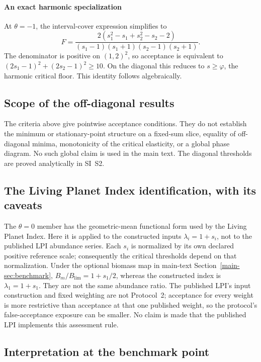 \documentclass[preprint,11pt,authoryear]{elsarticle}
\theoremstyle{remark}
\begin{document}
\paragraph{An exact harmonic specialization} At $\theta=-1$, the interval-cover expression simplifies to
\[
F=\frac{2(s_1^2-s_1+s_2^2-s_2-2)}{(s_1-1)(s_1+1)(s_2-1)(s_2+1)}.
\]
The denominator is positive on $(1,2)^2$, so acceptance is equivalent to $(2s_1-1)^2+(2s_2-1)^2\ge10$. On the diagonal this reduces to $s\ge\varphi$, the harmonic critical floor. This identity follows algebraically.

\subsection{Scope of the off-diagonal results}

The criteria above give pointwise acceptance conditions. They do not establish the minimum or stationary-point structure on a fixed-sum slice, equality of off-diagonal minima, monotonicity of the critical elasticity, or a global phase diagram. No such global claim is used in the main text. The diagonal thresholds are proved analytically in SI~S2.

\subsection{The Living Planet Index identification, with its caveats}

The $\theta=0$ member has the geometric-mean functional form used by the Living Planet Index. Here it is applied to the constructed inputs $\lambda_i=1+s_i$, not to the published LPI abundance series. Each $s_i$ is normalized by its own declared positive reference scale; consequently the critical thresholds depend on that normalization. Under the optional biomass map in main-text Section~\ref{main-sec:benchmark}, $B_m/B_{\mathrm{lim}}=1+s_1/2$, whereas the constructed index is $\lambda_1=1+s_1$. They are not the same abundance ratio. The published LPI's input construction and fixed weighting are not Protocol~2; acceptance for every weight is more restrictive than acceptance at that one published weight, so the protocol's false-acceptance exposure can be smaller. No claim is made that the published LPI implements this assessment rule.

\subsection{Interpretation at the benchmark point}
\end{document}
